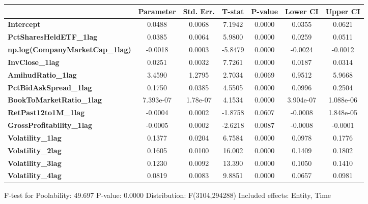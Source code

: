 \begin{center}
\begin{tabular}{lclc}
\bottomrule
\end{tabular}
\begin{tabular}{lcccccc}
                                        & \textbf{Parameter} & \textbf{Std. Err.} & \textbf{T-stat} & \textbf{P-value} & \textbf{Lower CI} & \textbf{Upper CI}  \\
\midrule
\textbf{Intercept}                      &       0.0488       &       0.0068       &      7.1942     &      0.0000      &       0.0355      &       0.0621       \\
\textbf{PctSharesHeldETF\_1lag}         &       0.0385       &       0.0064       &      5.9800     &      0.0000      &       0.0259      &       0.0511       \\
\textbf{np.log(CompanyMarketCap\_1lag)} &      -0.0018       &       0.0003       &     -5.8479     &      0.0000      &      -0.0024      &      -0.0012       \\
\textbf{InvClose\_1lag}                 &       0.0251       &       0.0032       &      7.7261     &      0.0000      &       0.0187      &       0.0314       \\
\textbf{AmihudRatio\_1lag}              &       3.4590       &       1.2795       &      2.7034     &      0.0069      &       0.9512      &       5.9668       \\
\textbf{PctBidAskSpread\_1lag}          &       0.1750       &       0.0385       &      4.5505     &      0.0000      &       0.0996      &       0.2504       \\
\textbf{BookToMarketRatio\_1lag}        &     7.393e-07      &      1.78e-07      &      4.1534     &      0.0000      &     3.904e-07     &     1.088e-06      \\
\textbf{RetPast12to1M\_1lag}            &      -0.0004       &       0.0002       &     -1.8758     &      0.0607      &      -0.0008      &     1.848e-05      \\
\textbf{GrossProfitability\_1lag}       &      -0.0005       &       0.0002       &     -2.6218     &      0.0087      &      -0.0008      &      -0.0001       \\
\textbf{Volatility\_1lag}               &       0.1377       &       0.0204       &      6.7584     &      0.0000      &       0.0978      &       0.1776       \\
\textbf{Volatility\_2lag}               &       0.1605       &       0.0100       &      16.002     &      0.0000      &       0.1409      &       0.1802       \\
\textbf{Volatility\_3lag}               &       0.1230       &       0.0092       &      13.390     &      0.0000      &       0.1050      &       0.1410       \\
\textbf{Volatility\_4lag}               &       0.0819       &       0.0083       &      9.8851     &      0.0000      &       0.0657      &       0.0981       \\
\bottomrule
\end{tabular}
\end{center}

F-test for Poolability: 49.697 \newline
 P-value: 0.0000 \newline
 Distribution: F(3104,294288) \newline
  \newline
 Included effects: Entity, Time